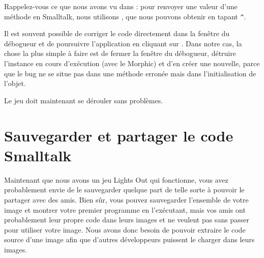 \documentclass[a4paper,10pt,twoside]{book}
\begin{document}
\noindent
Rappelez-vous ce que nous avons vu dans :
pour renvoyer une valeur d'une méthode en Smalltalk, nous utilisons 
 \ct{^}, que nous pouvons obtenir en tapant \verb|^|.

Il est souvent possible de corriger le code directement dans la
fen\^etre du débogueur et de poursuivre l'application en cliquant sur
.
Dans notre cas, la chose la plus simple à faire est de fermer la
fen\^etre du débogueur, détruire l'instance en cours d'exécution (avec
le  Morphic) et d'en créer une nouvelle, parce que le bug
ne se situe pas dans une méthode erronée mais dans
l'initialisation de l'objet.


Le jeu doit maintenant se dérouler sans problèmes.


\section{Sauvegarder et partager le code Smalltalk}

Maintenant que nous avons un jeu Lights Out qui fonctionne, vous avez
probablement envie de le sauvegarder quelque part de telle sorte à
pouvoir le partager avec des amis. Bien s\^ur, vous pouvez sauvegarder
l'ensemble de votre image \pharo et montrer votre premier programme
en l'exécutant, mais vos amis ont probablement leur propre code dans
leurs images et ne veulent pas sans passer pour utiliser votre image.
Nous avons donc besoin de pouvoir extraire le code source d'une image
\pharo afin que d'autres développeurs puissent le charger dans leurs images.
\end{document}
